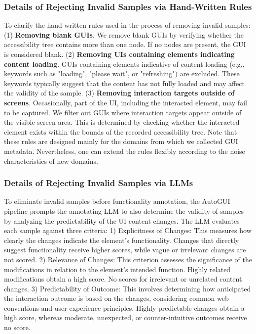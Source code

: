 \subsubsection{Details of Rejecting Invalid Samples via Hand-Written Rules}
To clarify the hand-written rules used in the process of removing invalid samples: (1) \textbf{Removing blank GUIs}. We remove blank GUIs by verifying whether the accessibility tree contains more than one node. If no nodes are present, the GUI is considered blank. (2) \textbf{Removing UIs containing elements indicating content loading}. GUIs containing elements indicative of content loading (e.g., keywords such as "loading", "please wait", or "refreshing") are excluded. These keywords typically suggest that the content has not fully loaded and may affect the validity of the sample. (3) \textbf{Removing interaction targets outside of screens}. Occasionally, part of the UI, including the interacted element, may fail to be captured. We filter out GUIs where interaction targets appear outside of the visible screen area. This is determined by checking whether the interacted element exists within the bounds of the recorded accessibility tree. Note that these rules are designed mainly for the domains from which we collected GUI metadata. Nevertheless, one can extend the rules flexibly according to the noise characteristics of new domains.

\subsubsection{Details of Rejecting Invalid Samples via LLMs}
\label{suc:supp:reject details}
To eliminate invalid samples before functionality annotation, the AutoGUI pipeline prompts the annotating LLM to also determine the validity of samples by analyzing the predictability of the UI content changes. The LLM evaluates each sample against three criteria: 1) Explicitness of Changes: This measures how clearly the changes indicate the element's functionality. Changes that directly suggest functionality receive higher scores, while vague or irrelevant changes are not scored. 2) Relevance of Changes: This criterion assesses the significance of the modifications in relation to the element's intended function. Highly related modifications obtain a high score. No scores for irrelevant or unrelated content changes. 3) Predictability of Outcome: This involves determining how anticipated the interaction outcome is based on the changes, considering common web conventions and user experience principles. Highly predictable changes obtain a high score, whereas moderate, unexpected, or counter-intuitive outcomes receive no score.


